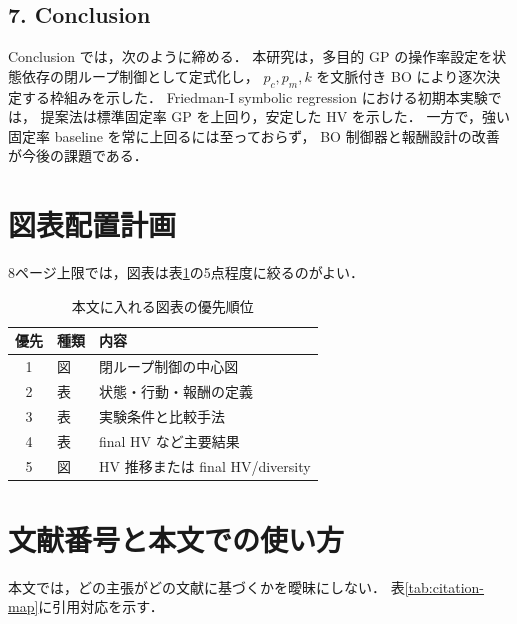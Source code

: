 \documentclass[a4paper,10pt,twocolumn]{ltjsarticle}
\newcommand{\HV}{\mathrm{HV}}
\newcommand{\pc}{p_c}
\newcommand{\pmut}{p_m}
\begin{document}
\subsection{7. Conclusion}

Conclusion では，次のように締める．
本研究は，多目的 GP の操作率設定を状態依存の閉ループ制御として定式化し，
\(\pc,\pmut,k\) を文脈付き BO により逐次決定する枠組みを示した．
Friedman-I symbolic regression における初期本実験では，
提案法は標準固定率 GP を上回り，安定した \(\HV\) を示した．
一方で，強い固定率 baseline を常に上回るには至っておらず，
BO 制御器と報酬設計の改善が今後の課題である．

\section{図表配置計画}

8ページ上限では，図表は表\ref{tab:figure-table-plan}の5点程度に絞るのがよい．

\begin{table}[tb]
\centering
\caption{本文に入れる図表の優先順位}
\label{tab:figure-table-plan}
\begin{tabular}{cll}
\toprule
優先 & 種類 & 内容 \\
\midrule
1 & 図 & 閉ループ制御の中心図 \\
2 & 表 & 状態・行動・報酬の定義 \\
3 & 表 & 実験条件と比較手法 \\
4 & 表 & final HV など主要結果 \\
5 & 図 & HV 推移または final HV/diversity \\
\bottomrule
\end{tabular}
\end{table}

\section{文献番号と本文での使い方}

本文では，どの主張がどの文献に基づくかを曖昧にしない．
表\ref{tab:citation-map}に引用対応を示す．
\end{document}
